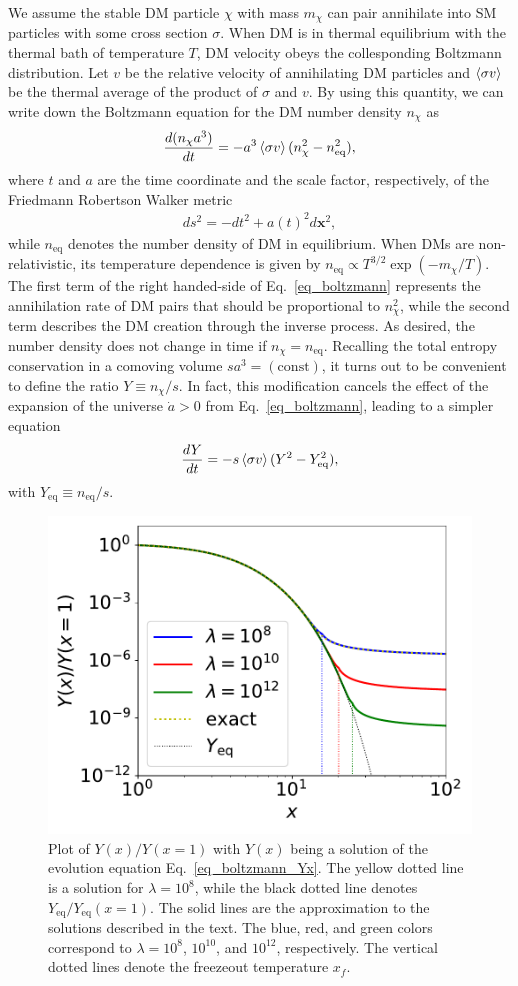 \documentclass[12pt,twoside,book]{article}
\begin{document}
We assume the stable DM particle $\chi$ with mass $m_\chi$ can pair
annihilate into SM particles with some cross section $\sigma$.  When DM
is in thermal equilibrium with the thermal bath of temperature $T$, DM
velocity obeys the collesponding Boltzmann distribution.  Let $v$ be the
relative velocity of annihilating DM particles and $\Braket{\sigma v}$
be the thermal average of the product of $\sigma$ and $v$.  By using
this quantity, we can write down the Boltzmann equation for the DM
number density $n_\chi$ as
\begin{align}
 \frac{d (n_\chi a^3)}{d t} =
 - a^3 \Braket{\sigma v} (n_\chi^2 - n_{\mathrm{eq}}^2),\label{eq_boltzmann}
\end{align}
where $t$ and $a$ are the time coordinate and the scale factor,
respectively, of the Friedmann Robertson Walker metric
\begin{align}
 d s^2 = - d t^2 + a(t)^2 d \bm{x}^2,
\end{align}
while $n_{\mathrm{eq}}$ denotes the number density of DM in equilibrium.
When DMs are non-relativistic, its temperature dependence is given by
$n_{\mathrm{eq}} \propto T^{3/2} \exp \left( -m_\chi / T \right)$.  The
first term of the right handed-side of Eq.~\eqref{eq_boltzmann}
represents the annihilation rate of DM pairs that should be proportional
to $n_\chi^2$, while the second term describes the DM creation through
the inverse process.  As desired, the number density does not change in
time if $n_\chi = n_{\mathrm{eq}}$.  Recalling the total entropy
conservation in a comoving volume $s a^3 = (\mathrm{const})$, it turns
out to be convenient to define the ratio $Y \equiv n_\chi / s$.  In
fact, this modification cancels the effect of the expansion of the
universe $\dot{a} > 0$ from Eq.~\eqref{eq_boltzmann}, leading to a
simpler equation
\begin{align}
 \frac{d Y}{d t} =
 -s \Braket{\sigma v} (Y^2 - Y_{\mathrm{eq}}^2),\label{eq_boltzmann_Yt}
\end{align}
with $Y_{\mathrm{eq}} \equiv n_{\mathrm{eq}} / s$.

\begin{figure}[t]
 \centering \includegraphics[width=0.5\hsize]{figure/DMrelic.pdf}
 \caption{Plot of $Y(x) / Y(x=1)$ with $Y(x)$ being a solution of the
 evolution equation Eq.~\eqref{eq_boltzmann_Yx}.  The yellow dotted line
 is a solution for $\lambda = 10^{8}$, while the black dotted line
 denotes $Y_{\mathrm{eq}} / Y_{\mathrm{eq}} (x=1)$.  The solid lines are
 the approximation to the solutions described in the text.  The blue,
 red, and green colors correspond to $\lambda = 10^8$, $10^{10}$, and
 $10^{12}$, respectively.  The vertical dotted lines denote the
 freezeout temperature $x_f$.}  \label{fig_DM_relic}
\end{figure}
\end{document}
